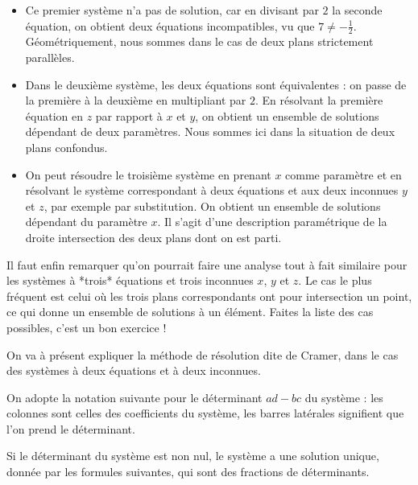 \begin{itemize}
	\item Ce premier système n'a pas de solution, car en divisant par $2$ la seconde équation, 
	on obtient deux équations  incompatibles, vu que $7 \neq -\frac{1}{2}$. 
	Géométriquement, nous sommes dans le cas de deux plans strictement parallèles.
		
	\change
	
	\item Dans le deuxième système, les deux équations sont équivalentes : 
	on passe de la première à la deuxième en multipliant par  \(2\). 
	En résolvant la première équation en $z$ par rapport à $x$ et $y$, 
	on obtient un ensemble de solutions dépendant de deux paramètres. 
	Nous sommes ici dans la situation de deux plans confondus.
		
	\change
	
\item On peut résoudre le troisième système en prenant 	\(x\) 
comme paramètre et en résolvant le système correspondant à deux 
équations et aux deux inconnues \(y\) et \(z\), par exemple par substitution.  
On obtient un ensemble de solutions dépendant du paramètre \(x\). 
Il s'agit d'une description paramétrique de la droite intersection des deux plans dont on est parti.
\end{itemize}

Il faut enfin remarquer qu'on pourrait faire une analyse tout à fait similaire pour les systèmes à *trois* équations et trois inconnues \(x\), \(y\) et \(z\). Le cas le plus fréquent est celui où les trois plans correspondants ont pour intersection un point, ce qui donne un ensemble de solutions à un élément. Faites la liste des cas possibles, c'est un bon exercice !

\diapo

On va à présent expliquer la méthode de résolution dite de Cramer, dans le cas des systèmes à deux équations et à deux inconnues.

\change

On adopte la notation suivante pour le déterminant $ad-bc$ du système : les colonnes sont celles des coefficients du système, les barres latérales signifient que l'on prend le déterminant.

\change

Si le déterminant du système est non nul, le système a une solution unique, donnée par les formules suivantes, 
qui sont des fractions de déterminants.

